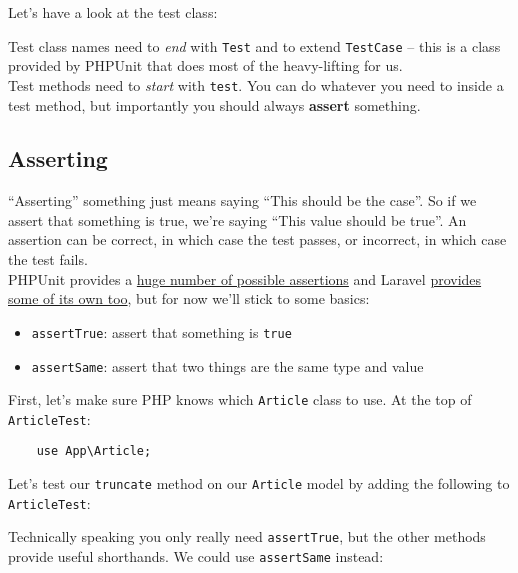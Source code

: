 Let's have a look at the test class:


Test class names need to \textit{end} with \texttt{Test} and to extend \texttt{TestCase} – this is a class provided by PHPUnit that does most of the heavy-lifting for us.
\\

Test methods need to \textit{start} with \texttt{test}. You can do whatever you need to inside a test method, but importantly you should always \textbf{assert} something.

\subsection{Asserting}

``Asserting'' something just means saying ``This should be the case''. So if we assert that something is true, we're saying ``This value should be true''. An assertion can be correct, in which case the test passes, or incorrect, in which case the test fails.
\\

PHPUnit provides a \href{https://phpunit.readthedocs.io/en/9.0/assertions.html}{huge number of possible assertions} and Laravel \href{https://laravel.com/docs/master/http-tests#available-assertions}{provides some of its own too}, but for now we'll stick to some basics:

\begin{itemize}
    \item \texttt{assertTrue}: assert that something is \texttt{true}
    \item \texttt{assertSame}: assert that two things are the same type and value
\end{itemize}

First, let's make sure PHP knows which \texttt{Article} class to use. At the top of \texttt{ArticleTest}:

\begin{verbatim}
    use App\Article;
\end{verbatim}

Let's test our \texttt{truncate} method on our \texttt{Article} model by adding the following to \texttt{ArticleTest}:



Technically speaking you only really need \texttt{assertTrue}, but the other methods provide useful shorthands. We could use \texttt{assertSame} instead:

